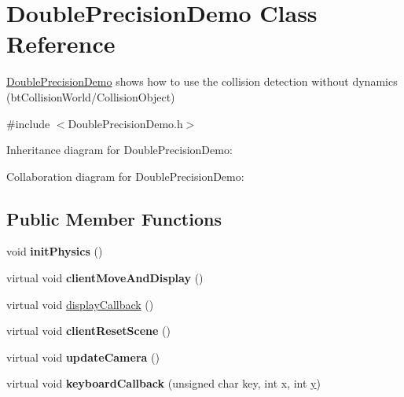 \hypertarget{class_double_precision_demo}{\section{Double\+Precision\+Demo Class Reference}
\label{class_double_precision_demo}
}


\hyperlink{class_double_precision_demo}{Double\+Precision\+Demo} shows how to use the collision detection without dynamics (bt\+Collision\+World/\+Collision\+Object)  




{\ttfamily \#include $<$Double\+Precision\+Demo.\+h$>$}



Inheritance diagram for Double\+Precision\+Demo\+:


Collaboration diagram for Double\+Precision\+Demo\+:
\subsection*{Public Member Functions}
\begin{DoxyCompactItemize}
\item 
\hypertarget{class_double_precision_demo_ad93e6bd4b91f2848021fd6546edf3b85}{void {\bfseries init\+Physics} ()}\label{class_double_precision_demo_ad93e6bd4b91f2848021fd6546edf3b85}

\item 
\hypertarget{class_double_precision_demo_a119e8cf37db310be90bce43258874197}{virtual void {\bfseries client\+Move\+And\+Display} ()}\label{class_double_precision_demo_a119e8cf37db310be90bce43258874197}

\item 
virtual void \hyperlink{class_double_precision_demo_af3cd7dac6d4bb39a9cde3896927463d0}{display\+Callback} ()
\item 
\hypertarget{class_double_precision_demo_a8061e594c4cd3b02fd899b3617d75ab1}{virtual void {\bfseries client\+Reset\+Scene} ()}\label{class_double_precision_demo_a8061e594c4cd3b02fd899b3617d75ab1}

\item 
\hypertarget{class_double_precision_demo_a8e5b3ac995f5c5ea61d0a831a40ddec3}{virtual void {\bfseries update\+Camera} ()}\label{class_double_precision_demo_a8e5b3ac995f5c5ea61d0a831a40ddec3}

\item 
\hypertarget{class_double_precision_demo_abe5c9c50be9f5a957df4a99579eafb5a}{virtual void {\bfseries keyboard\+Callback} (unsigned char key, int x, int \hyperlink{_ice_utils_8h_aa7ffaed69623192258fb8679569ff9ba}{y})}\label{class_double_precision_demo_abe5c9c50be9f5a957df4a99579eafb5a}

\end{DoxyCompactItemize}


